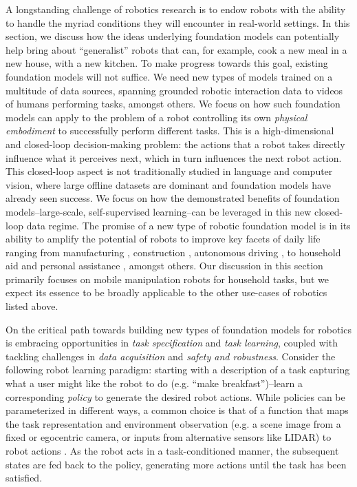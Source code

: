 A longstanding challenge of robotics research is to endow robots with the ability to handle the myriad conditions they will encounter in real-world settings. In this section, we discuss how the ideas underlying foundation models can potentially help bring about ``generalist'' robots that can, for example, cook a new meal in a new house, with a new kitchen. To make progress towards this goal, existing foundation models will not suffice. We need new types of models trained on a multitude of data sources, spanning grounded robotic interaction data to videos of humans performing tasks, amongst others. We focus on how such foundation models can apply to the problem of a robot controlling its own \textit{physical embodiment} to successfully perform different tasks. This is a high-dimensional and closed-loop decision-making problem: the actions that a robot takes directly influence what it perceives next, which in turn influences the next robot action. This closed-loop aspect is not traditionally studied in language and computer vision, where large offline datasets are dominant and foundation models have already seen success. We focus on how the demonstrated benefits of foundation models--large-scale, self-supervised learning--can be leveraged in this new closed-loop data regime. The promise of a new type of robotic foundation model is in its ability to amplify the potential of robots to improve key facets of daily life ranging from manufacturing \citep{nof1999handbook, sanneman2020state}, construction \citep{khoshnevis2004automated, bock2007construction}, autonomous driving \citep{thorpe1988vision, badue2020self}, to household aid \citep{thrun1995lifelong, brooks2002flesh, Dillmann2004TeachingAL, goodrich2007hri, Gupta2018RobotLI, shridhar2020alfred} and personal assistance \citep{dragan2013formalizing, javdani2018shared}, amongst others. Our discussion in this section primarily focuses on mobile manipulation robots for household tasks, but we expect its essence to be broadly applicable to the other use-cases of robotics listed above.

On the critical path towards building new types of foundation models for robotics is embracing opportunities in \textit{task specification} and \textit{task learning}, coupled with tackling challenges in \textit{data acquisition} and \textit{safety and robustness}. Consider the following robot learning paradigm: starting with a description of a task capturing what a user might like the robot to do (e.g. ``make breakfast'')--learn a corresponding \textit{policy} to generate the desired robot actions. While policies can be parameterized in different ways, a common choice is that of a function that maps the task representation and environment observation (e.g. a scene image from a fixed or egocentric camera, or inputs from alternative sensors like LIDAR) to robot actions \citep{andrychowicz2017hindsight, nair2018rig}. As the robot acts in a task-conditioned manner, the subsequent states are fed back to the policy, generating more actions until the task has been satisfied.

